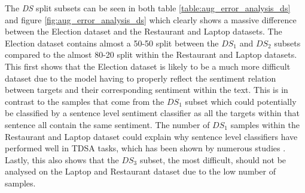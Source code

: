 The \textit{DS} split subsets can be seen in both table \ref{table:aug_error_analysis_ds} and figure \ref{fig:aug_error_analysis_ds} which clearly shows a massive difference between the Election dataset and the Restaurant and Laptop datasets. The Election dataset contains almost a 50-50 split between the $DS_1$ and $DS_2$ subsets compared to the almost 80-20 split within the Restaurant and Laptop datasets. This first shows that the Election dataset is likely to be a much more difficult dataset due to the model having to properly reflect the sentiment relation between targets and their corresponding sentiment within the text. This is in contrast to the samples that come from the $DS_1$ subset which could potentially be classified by a sentence level sentiment classifier as all the targets within that sentence all contain the same sentiment. The number of $DS_1$ samples within the Restaurant and Laptop dataset could explain why sentence level classifiers have performed well in TDSA tasks, which has been shown by numerous studies \citep{tang-etal-2016-aspect,wang-etal-2016-attention,he-etal-2018-effective,jiang-etal-2019-challenge}. Lastly, this also shows that the $DS_3$ subset, the most difficult, should not be analysed on the Laptop and Restaurant dataset due to the low number of samples. 
\begin{figure}[h!]
    \begin{floatrow}
    \end{floatrow}
\end{figure}

